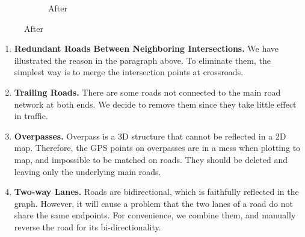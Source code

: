 \begin{figure}[htb]
\begin{subfigure}[t]{0.45\linewidth}
      \caption{After}
      \label{fig: graph_after}
  \end{subfigure}
\end{figure}

\begin{enumerate}
  \item \textbf{Redundant Roads Between Neighboring Intersections.} We have illustrated the reason in the paragraph above. To eliminate them, the simplest way is to merge the intersection points at crossroads.
  \item \textbf{Trailing Roads.} There are some roads not connected to the main road network at both ends. We decide to remove them since they take little effect in traffic.
  \item \textbf{Overpasses.} Overpass is a 3D structure that cannot be reflected in a 2D map. Therefore, the GPS points on overpasses are in a mess when plotting to map, and impossible to be matched on roads. They should be deleted and leaving only the underlying main roads.
  \item \textbf{Two-way Lanes.} Roads are bidirectional, which is faithfully reflected in the graph. However, it will cause a problem that the two lanes of a road do not share the same endpoints. For convenience, we combine them, and manually reverse the road for its bi-directionality.
\end{enumerate}

